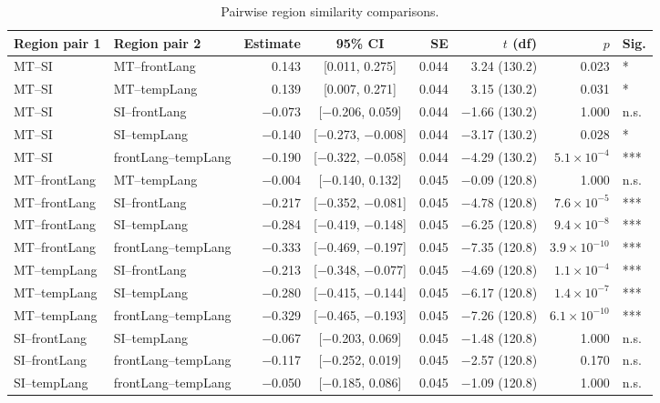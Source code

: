 \begin{table}[h]
\centering
\begin{tabular}{llrcrrrl}
\toprule
Region pair 1 & Region pair 2 & Estimate & 95\% CI & SE & $t$ (df) & $p$ & Sig. \\
\midrule
MT--SI & MT--frontLang & 0.143 & [0.011, 0.275] & 0.044 & 3.24 (130.2) & 0.023 & * \\
MT--SI & MT--tempLang & 0.139 & [0.007, 0.271] & 0.044 & 3.15 (130.2) & 0.031 & * \\
MT--SI & SI--frontLang & $-$0.073 & [$-$0.206, 0.059] & 0.044 & $-$1.66 (130.2) & 1.000 & n.s. \\
MT--SI & SI--tempLang & $-$0.140 & [$-$0.273, $-$0.008] & 0.044 & $-$3.17 (130.2) & 0.028 & * \\
MT--SI & frontLang--tempLang & $-$0.190 & [$-$0.322, $-$0.058] & 0.044 & $-$4.29 (130.2) & $5.1\times10^{-4}$ & *** \\
MT--frontLang & MT--tempLang & $-$0.004 & [$-$0.140, 0.132] & 0.045 & $-$0.09 (120.8) & 1.000 & n.s. \\
MT--frontLang & SI--frontLang & $-$0.217 & [$-$0.352, $-$0.081] & 0.045 & $-$4.78 (120.8) & $7.6\times10^{-5}$ & *** \\
MT--frontLang & SI--tempLang & $-$0.284 & [$-$0.419, $-$0.148] & 0.045 & $-$6.25 (120.8) & $9.4\times10^{-8}$ & *** \\
MT--frontLang & frontLang--tempLang & $-$0.333 & [$-$0.469, $-$0.197] & 0.045 & $-$7.35 (120.8) & $3.9\times10^{-10}$ & *** \\
MT--tempLang & SI--frontLang & $-$0.213 & [$-$0.348, $-$0.077] & 0.045 & $-$4.69 (120.8) & $1.1\times10^{-4}$ & *** \\
MT--tempLang & SI--tempLang & $-$0.280 & [$-$0.415, $-$0.144] & 0.045 & $-$6.17 (120.8) & $1.4\times10^{-7}$ & *** \\
MT--tempLang & frontLang--tempLang & $-$0.329 & [$-$0.465, $-$0.193] & 0.045 & $-$7.26 (120.8) & $6.1\times10^{-10}$ & *** \\
SI--frontLang & SI--tempLang & $-$0.067 & [$-$0.203, 0.069] & 0.045 & $-$1.48 (120.8) & 1.000 & n.s. \\
SI--frontLang & frontLang--tempLang & $-$0.117 & [$-$0.252, 0.019] & 0.045 & $-$2.57 (120.8) & 0.170 & n.s. \\
SI--tempLang & frontLang--tempLang & $-$0.050 & [$-$0.185, 0.086] & 0.045 & $-$1.09 (120.8) & 1.000 & n.s. \\
\bottomrule
\end{tabular}
\caption{Pairwise region similarity comparisons.}
\end{table}
